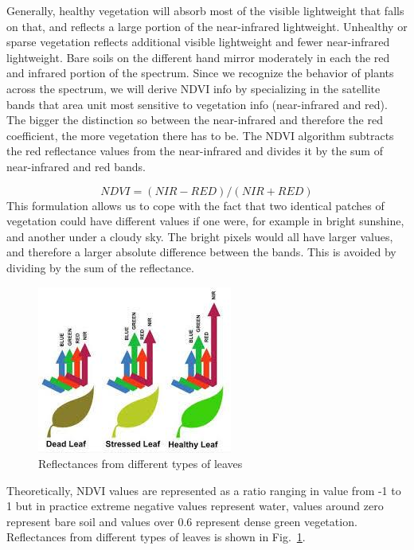 Generally, healthy vegetation will absorb most of the visible lightweight that falls on that, and reflects a large portion of the near-infrared lightweight. Unhealthy or sparse vegetation reflects additional visible lightweight and fewer near-infrared lightweight. Bare soils on the different hand mirror moderately in each the red and infrared portion of the spectrum. Since we recognize the behavior of plants across the spectrum, we will derive NDVI info by specializing in the satellite bands that area unit most sensitive to  vegetation info (near-infrared and red). The bigger the distinction so between the near-infrared and therefore the red coefficient, the more vegetation there has to be. The NDVI algorithm subtracts the red reflectance values from the near-infrared and divides it by the sum of near-infrared and red bands.

\begin{equation} \label{eq: eq-1}
NDVI = (NIR-RED)/(NIR+RED)
\end{equation}
This formulation allows us to cope with the fact that two identical patches of vegetation could have different values if one were, for example in bright sunshine, and another under a cloudy sky. The bright pixels would all have larger values, and therefore a larger absolute difference between the bands. This is avoided by dividing by the sum of the reflectance. 

\begin{figure}[h]
	\includegraphics[height=0.5\linewidth]{fin_img_8}
	\centering
	\caption{\label{fig: reflectance}Reflectances from different types of leaves}
\end{figure}

Theoretically, NDVI values are represented as a ratio ranging in value from -1 to 1 but in practice extreme negative values represent water, values around zero represent bare soil and values over 0.6 represent dense green vegetation. Reflectances from different types of leaves is shown in Fig.~\ref{fig: reflectance}.


